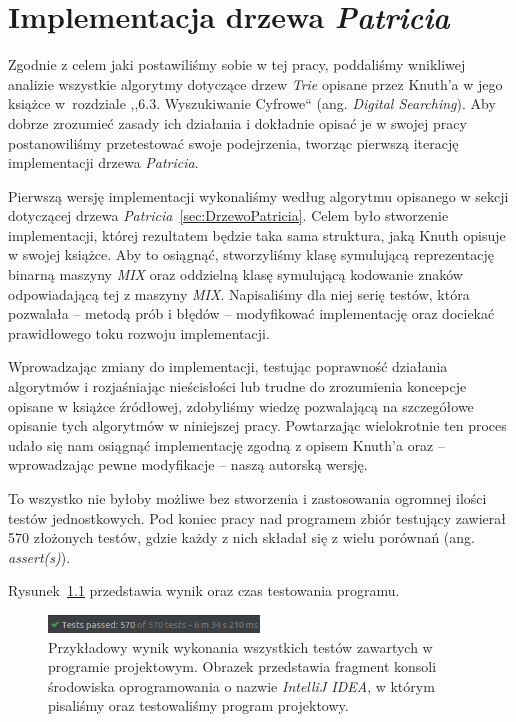 \chapter{Implementacja drzewa \emph{Patricia}}\label{cha:czescPraktyczna}

    Zgodnie z celem jaki postawiliśmy sobie w tej pracy, poddaliśmy wnikliwej analizie wszystkie algorytmy dotyczące drzew \emph{Trie} opisane przez Knuth'a w jego książce w~rozdziale ,,6.3. Wyszukiwanie Cyfrowe`` (ang. \emph{Digital Searching}). Aby dobrze zrozumieć zasady ich działania i dokładnie opisać je w swojej pracy postanowiliśmy przetestować swoje podejrzenia, tworząc pierwszą iterację implementacji drzewa \emph{Patricia}. 
	
    Pierwszą wersję implementacji wykonaliśmy według algorytmu opisanego w sekcji dotyczącej drzewa \emph{Patricia}~\ref{sec:DrzewoPatricia}. Celem było stworzenie implementacji, której rezultatem będzie taka sama struktura, jaką Knuth opisuje w swojej książce. Aby to osiągnąć, stworzyliśmy klasę symulującą reprezentację binarną maszyny \emph{MIX} oraz oddzielną klasę symulującą kodowanie znaków odpowiadającą tej z maszyny \emph{MIX}. Napisaliśmy dla niej serię testów, która pozwalała -- metodą prób i błędów -- modyfikować implementację oraz dociekać prawidłowego toku rozwoju implementacji.
    
    Wprowadzając zmiany do implementacji, testując poprawność działania algorytmów i rozjaśniając nieścisłości lub trudne do zrozumienia koncepcje opisane w książce źródłowej, zdobyliśmy wiedzę pozwalającą na szczegółowe opisanie tych algorytmów w niniejszej pracy. Powtarzając wielokrotnie ten proces udało się nam osiągnąć implementację zgodną z opisem Knuth'a oraz -- wprowadzając pewne modyfikacje -- naszą autorską wersję.
    
    To wszystko nie byłoby możliwe bez stworzenia i zastosowania ogromnej ilości testów jednostkowych. Pod koniec pracy nad programem zbiór testujący zawierał 570 złożonych testów, gdzie każdy z nich składał się z wielu porównań (ang. \emph{assert(s)}). 
    
    Rysunek~\ref{fig:Tests} przedstawia wynik oraz czas testowania programu.
    
    \begin{figure}
		\caption{Przykładowy wynik wykonania wszystkich testów zawartych w programie projektowym. Obrazek przedstawia fragment konsoli środowiska oprogramowania o nazwie \emph{IntelliJ IDEA}, w którym pisaliśmy oraz testowaliśmy program projektowy. }\label{fig:Tests}
		\centering
		\includegraphics[width = 0.5\textwidth]{tests.png}
	\end{figure}

